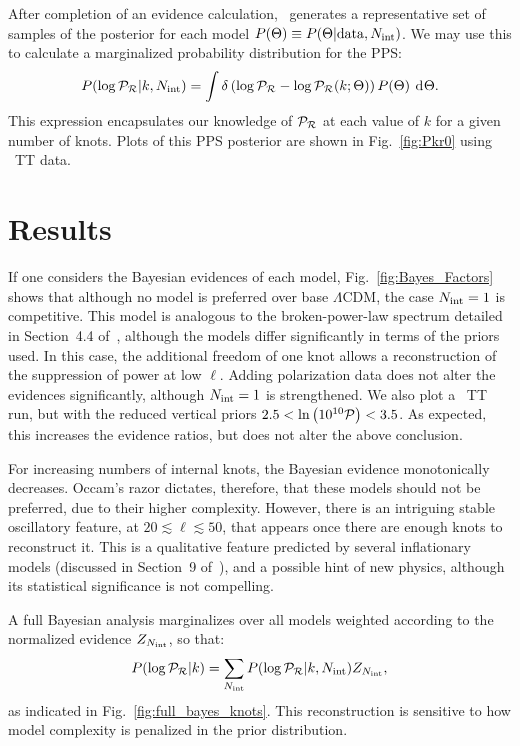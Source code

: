 After completion of an evidence calculation, \PolyChord\ generates a representative set of samples of the posterior for each model \(P(\Theta) \equiv P(\Theta|\mathrm{data},N_\mathrm{int})\). We may use this to calculate a marginalized probability distribution for the PPS\@:
\begin{equation}
  P(\log\mathcal{P}_\mathcal{R}|k,N_\mathrm{int}) = \int \delta\left(\log\mathcal{P}_\mathcal{R} - \log\mathcal{P}_\mathcal{R}(k;\Theta)\right)P(\Theta)\:\operatorname{d}^{}\!{\Theta}.
  \label{eqn:margPR}
\end{equation}
This expression encapsulates our knowledge of \(\mathcal{P}_\mathcal{R}\) at each value of \(k\) for a given number of knots.  Plots of this PPS posterior are shown in Fig.~\ref{fig:Pkr0} using \Planck\ TT data.


\section{Results}
If one considers the Bayesian evidences of each model, Fig.~\ref{fig:Bayes_Factors} shows that although no model is preferred over base \(\Lambda\)CDM, the case \(N_\mathrm{int}=1\) is competitive. This model is analogous to the broken-power-law spectrum detailed in Section~4.4 of~\cite{planck2015-a1}, although the models differ significantly in terms of the priors used. In this case, the additional freedom of one knot allows a reconstruction of the suppression of power at low \(\ell\). Adding polarization data does not alter the evidences significantly, although \(N_\mathrm{int}=1\) is strengthened. We also plot a \Planck\ TT run, but with the reduced vertical priors \({2.5<\ln\left(10^{10}\mathcal{P}\right)<3.5}\).  As expected, this increases the evidence ratios, but does not alter the above conclusion.

For increasing numbers of internal knots, the Bayesian evidence monotonically decreases. Occam's razor dictates, therefore, that these models should not be preferred, due to their higher complexity. However, there is an intriguing stable oscillatory feature, at \(20\lesssim\ell\lesssim50\), that appears once there are enough knots to reconstruct it.  This is a qualitative feature predicted by several inflationary models (discussed in Section~9 of~\citealp{planck2015-a1}), and a possible hint of new physics, although its statistical significance is not compelling.

A full Bayesian analysis marginalizes over all models weighted according to the normalized evidence \(Z_{N_\mathrm{int}}\), so that:
\begin{equation}
  P(\log\mathcal{P}_\mathcal{R}|k) = \sum\limits_{N_\mathrm{int}} P(\log\mathcal{P}_\mathcal{R}|k,N_\mathrm{int}) Z_{N_\mathrm{int}},
  \label{eqn:margPR_full}
\end{equation}
as indicated in Fig.~\ref{fig:full_bayes_knots}.  This reconstruction is sensitive to how model complexity is penalized in the prior distribution. 

